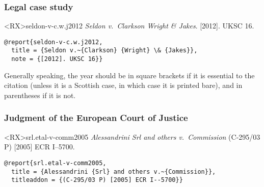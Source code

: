 \documentclass[10pt,a4paper]{article}
\newenvironment{info}{%
  \begin{list}{\makebox[2em][c]{\faInfoCircle}}{%
    \setlength{\leftmargin}{2em}
    \setlength{\labelwidth}{2em}
    \setlength{\labelsep}{0pt}}
}{\end{list}}
\begin{document}
\subsubsection*{Legal case study}

\begin{bibexbox}<RX>{seldon-v-c.w.j2012}
  \emph{Seldon v.~Clarkson Wright \& Jakes}. [2012]. UKSC 16.
  \tcblower
\begin{Verbatim}
@report{seldon-v-c.w.j2012,
  title = {Seldon v.~{Clarkson} {Wright} \& {Jakes}},
  note = {[2012]. UKSC 16}}
\end{Verbatim}
\end{bibexbox}

\begin{info}\item
Generally speaking, the year should be in square brackets if it is essential to the citation
(unless it is a Scottish case, in which case it is printed bare), and in parentheses if it is
not.
\end{info}

\subsubsection*{Judgment of the European Court of Justice}

\begin{bibexbox}<RX>{srl.etal-v-comm2005}
  \emph{Alessandrini Srl and others v.~Commission} (C-295/03 P) [2005] ECR I--5700.
  \tcblower
\begin{Verbatim}
@report{srl.etal-v-comm2005,
  title = {Alessandrini {Srl} and others v.~{Commission}},
  titleaddon = {(C-295/03 P) [2005] ECR I--5700}}
\end{Verbatim}
\end{bibexbox}



\end{document}
